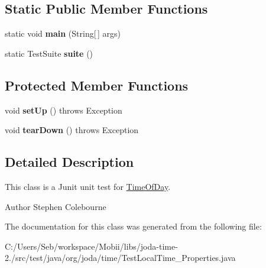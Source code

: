 \subsection*{Static Public Member Functions}
\begin{DoxyCompactItemize}
\item 
\hypertarget{classorg_1_1joda_1_1time_1_1_test_local_time___properties_a7e9cec30c2a02dbb3de6e66a45ba27b9}{static void {\bfseries main} (String\mbox{[}$\,$\mbox{]} args)}\label{classorg_1_1joda_1_1time_1_1_test_local_time___properties_a7e9cec30c2a02dbb3de6e66a45ba27b9}

\item 
\hypertarget{classorg_1_1joda_1_1time_1_1_test_local_time___properties_a749806b6c10746fcc2a242bc8cf58c59}{static Test\-Suite {\bfseries suite} ()}\label{classorg_1_1joda_1_1time_1_1_test_local_time___properties_a749806b6c10746fcc2a242bc8cf58c59}

\end{DoxyCompactItemize}
\subsection*{Protected Member Functions}
\begin{DoxyCompactItemize}
\item 
\hypertarget{classorg_1_1joda_1_1time_1_1_test_local_time___properties_adf5f1cc42bf81b7eaacb46532a2b7af8}{void {\bfseries set\-Up} ()  throws Exception }\label{classorg_1_1joda_1_1time_1_1_test_local_time___properties_adf5f1cc42bf81b7eaacb46532a2b7af8}

\item 
\hypertarget{classorg_1_1joda_1_1time_1_1_test_local_time___properties_a3aabc76245f88b28c6aed0871a0be408}{void {\bfseries tear\-Down} ()  throws Exception }\label{classorg_1_1joda_1_1time_1_1_test_local_time___properties_a3aabc76245f88b28c6aed0871a0be408}

\end{DoxyCompactItemize}


\subsection{Detailed Description}
This class is a Junit unit test for \hyperlink{classorg_1_1joda_1_1time_1_1_time_of_day}{Time\-Of\-Day}.

\begin{DoxyAuthor}{Author}
Stephen Colebourne 
\end{DoxyAuthor}


The documentation for this class was generated from the following file\-:\begin{DoxyCompactItemize}
\item 
C\-:/\-Users/\-Seb/workspace/\-Mobii/libs/joda-\/time-\/2./src/test/java/org/joda/time/Test\-Local\-Time\-\_\-\-Properties.\-java\end{DoxyCompactItemize}
